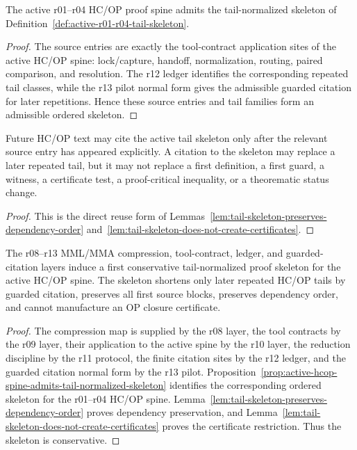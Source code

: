 \begin{proposition}
\label{prop:active-hcop-spine-admits-tail-normalized-skeleton}
The active r01--r04 HC/OP proof spine admits the tail-normalized skeleton of Definition~\ref{def:active-r01-r04-tail-skeleton}.
\end{proposition}

\begin{proof}
The source entries are exactly the tool-contract application sites of the active HC/OP spine: lock/capture, handoff, normalization, routing, paired comparison, and resolution. The r12 ledger identifies the corresponding repeated tail classes, while the r13 pilot normal form gives the admissible guarded citation for later repetitions. Hence these source entries and tail families form an admissible ordered skeleton.
\end{proof}

\begin{corollary}
\label{cor:tail-normalized-reuse-rule}
Future HC/OP text may cite the active tail skeleton only after the relevant source entry has appeared explicitly. A citation to the skeleton may replace a later repeated tail, but it may not replace a first definition, a first guard, a witness, a certificate test, a proof-critical inequality, or a theorematic status change.
\end{corollary}

\begin{proof}
This is the direct reuse form of Lemmas~\ref{lem:tail-skeleton-preserves-dependency-order} and~\ref{lem:tail-skeleton-does-not-create-certificates}.
\end{proof}

\begin{theorem}
\label{thm:first-tail-normalized-hcop-proof-skeleton}
The r08--r13 MML/MMA compression, tool-contract, ledger, and guarded-citation layers induce a first conservative tail-normalized proof skeleton for the active HC/OP spine. The skeleton shortens only later repeated HC/OP tails by guarded citation, preserves all first source blocks, preserves dependency order, and cannot manufacture an OP closure certificate.
\end{theorem}

\begin{proof}
The compression map is supplied by the r08 layer, the tool contracts by the r09 layer, their application to the active spine by the r10 layer, the reduction discipline by the r11 protocol, the finite citation sites by the r12 ledger, and the guarded citation normal form by the r13 pilot. Proposition~\ref{prop:active-hcop-spine-admits-tail-normalized-skeleton} identifies the corresponding ordered skeleton for the r01--r04 HC/OP spine. Lemma~\ref{lem:tail-skeleton-preserves-dependency-order} proves dependency preservation, and Lemma~\ref{lem:tail-skeleton-does-not-create-certificates} proves the certificate restriction. Thus the skeleton is conservative.
\end{proof}

